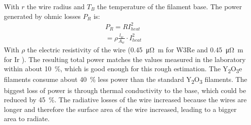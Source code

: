 		With $r$ the wire radius and $T_{B}$ the temperature of the filament base. The power generated by ohmic losses $P_R$ is:
		\begin{align}
			P_R = RI_{heat}^2&\\
				= \rho\frac{l_w}{A_w}\cdot I_{heat}^2&
		\end{align}
		With $\rho$ the electric resistivity of the wire (0.45~\si{\micro\ohm\meter} for W3Re \cite{thermResistTungst} and 0.45~\si{\micro\ohm\meter} for Ir \cite{Arblaster2016}). The resulting total power matches the values measured in the laboratory within about 10~\%, which is good enough for this rough estimation. The Y\textsubscript{2}O\textsubscript{3}e filaments consume about 40~\% less power than the standard Y\textsubscript{2}O\textsubscript{3} filaments. The biggest loss of power is through thermal conductivity to the base, which could be reduced by 45~\%. The radiative losses of the wire increased because the wires are longer and therefore the surface area of the wire increased, leading to a bigger area to radiate.
		
		
		
		
